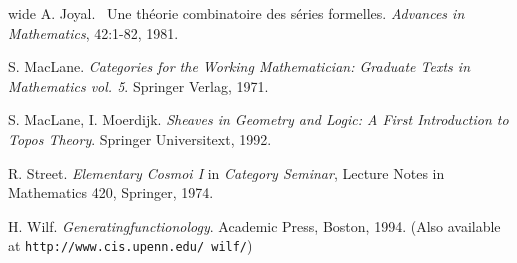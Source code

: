 \documentclass{amsart} \usepackage{amsmath,amssymb,bbm}
\begin{document}
\begin{thebibliography}{wide}
A. Joyal. \ Une th\'eorie combinatoire des s\'eries
formelles. {\textit{Advances in Mathematics}}, 42:1-82, 1981.

S. MacLane. {\textit{Categories for the Working
Mathematician: Graduate Texts in Mathematics vol. 5}}.  Springer
Verlag, 1971.

S. MacLane, I. Moerdijk. {\textit{Sheaves in
Geometry and Logic: A First Introduction to Topos Theory}}. Springer
Universitext, 1992.

R. Street.  {\textit{Elementary Cosmoi I}} in
{\textit{Category Seminar}}, Lecture Notes in Mathematics 420,
Springer, 1974.


 H. Wilf. {\textit{Generatingfunctionology}}.  Academic Press, Boston, 1994. (Also available at {\tt{http://www.cis.upenn.edu/~wilf/}})

\end{thebibliography}
\end{document}
